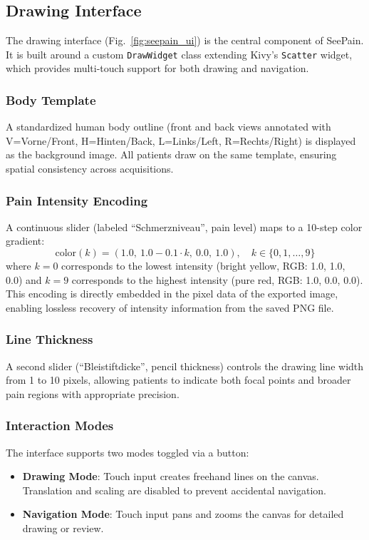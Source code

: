\documentclass[conference]{IEEEtran}
\begin{document}
\subsection{Drawing Interface}

The drawing interface (Fig.~\ref{fig:seepain_ui}) is the central component of SeePain. It is built around a custom \texttt{DrawWidget} class extending Kivy's \texttt{Scatter} widget, which provides multi-touch support for both drawing and navigation.

\subsubsection{Body Template}
A standardized human body outline (front and back views annotated with V=Vorne/Front, H=Hinten/Back, L=Links/Left, R=Rechts/Right) is displayed as the background image. All patients draw on the same template, ensuring spatial consistency across acquisitions.

\subsubsection{Pain Intensity Encoding}
A continuous slider (labeled ``Schmerzniveau'', pain level) maps to a 10-step color gradient:
\begin{equation}
    \text{color}(k) = (1.0,\ 1.0 - 0.1 \cdot k,\ 0.0,\ 1.0), \quad k \in \{0, 1, \ldots, 9\}
\end{equation}
where $k=0$ corresponds to the lowest intensity (bright yellow, RGB: 1.0, 1.0, 0.0) and $k=9$ corresponds to the highest intensity (pure red, RGB: 1.0, 0.0, 0.0). This encoding is directly embedded in the pixel data of the exported image, enabling lossless recovery of intensity information from the saved PNG file.

\subsubsection{Line Thickness}
A second slider (``Bleistiftdicke'', pencil thickness) controls the drawing line width from 1 to 10 pixels, allowing patients to indicate both focal points and broader pain regions with appropriate precision.

\subsubsection{Interaction Modes}
The interface supports two modes toggled via a button:
\begin{itemize}
    \item \textbf{Drawing Mode}: Touch input creates freehand lines on the canvas. Translation and scaling are disabled to prevent accidental navigation.
    \item \textbf{Navigation Mode}: Touch input pans and zooms the canvas for detailed drawing or review.
\end{itemize}
\end{document}
